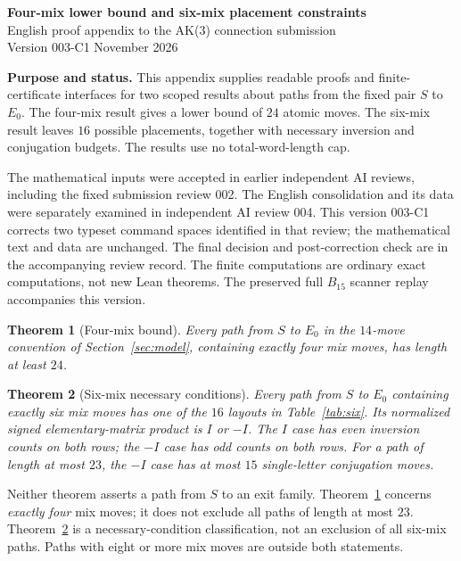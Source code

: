 \documentclass[11pt,a4paper]{article}
\newtheorem{maintheorem}{Theorem}
\theoremstyle{definition}\newtheorem{definition}[theorem]{Definition}
\theoremstyle{remark}\newtheorem{remark}[theorem]{Remark}
\begin{document}
\begin{center}
{\Large\bfseries\color{ink} Four-mix lower bound and six-mix placement constraints}\\[7pt]
{\large English proof appendix to the AK(3) connection submission}\\[6pt]
{Version 003-C1  November 2026}
\end{center}

\textbf{Purpose and status.} This appendix supplies readable proofs and finite-certificate interfaces for two scoped results about paths from the fixed pair $S$ to $E_0$. The four-mix result gives a lower bound of $24$ atomic moves. The six-mix result leaves $16$ possible placements, together with necessary inversion and conjugation budgets. The results use no total-word-length cap.

The mathematical inputs were accepted in earlier independent AI reviews, including the fixed submission review 002. The English consolidation and its data were separately examined in independent AI review 004. This version 003-C1 corrects two typeset command spaces identified in that review; the mathematical text and data are unchanged. The final decision and post-correction check are in the accompanying review record. The finite computations are ordinary exact computations, not new Lean theorems. The preserved full $B_{15}$ scanner replay accompanies this version.

\begin{maintheorem}[Four-mix bound]\label{thm:four}
Every path from $S$ to $E_0$ in the $14$-move convention of Section~\ref{sec:model}, containing exactly four mix moves, has length at least $24$.
\end{maintheorem}

\begin{maintheorem}[Six-mix necessary conditions]\label{thm:six}
Every path from $S$ to $E_0$ containing exactly six mix moves has one of the $16$ layouts in Table~\ref{tab:six}. Its normalized signed elementary-matrix product is $I$ or $-I$. The $I$ case has even inversion counts on both rows; the $-I$ case has odd counts on both rows. For a path of length at most $23$, the $-I$ case has at most $15$ single-letter conjugation moves.
\end{maintheorem}

Neither theorem asserts a path from $S$ to an exit family. Theorem~\ref{thm:four} concerns \emph{exactly four} mix moves; it does not exclude all paths of length at most $23$. Theorem~\ref{thm:six} is a necessary-condition classification, not an exclusion of all six-mix paths. Paths with eight or more mix moves are outside both statements.
\end{document}
